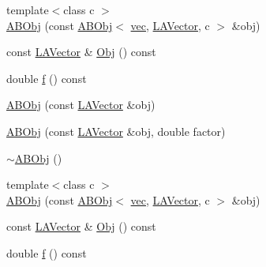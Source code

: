 \begin{DoxyCompactItemize}
\item 
{\footnotesize template$<$class c $>$ }\\\mbox{\hyperlink{classROOT_1_1Minuit2_1_1ABObj_3_01vec_00_01LAVector_00_01double_01_4_aeb6018846b4e8252a64eb21db982fe96}{A\+B\+Obj}} (const \mbox{\hyperlink{classROOT_1_1Minuit2_1_1ABObj}{A\+B\+Obj}}$<$ \mbox{\hyperlink{classROOT_1_1Minuit2_1_1vec}{vec}}, \mbox{\hyperlink{classROOT_1_1Minuit2_1_1LAVector}{L\+A\+Vector}}, c $>$ \&obj)
\item 
const \mbox{\hyperlink{classROOT_1_1Minuit2_1_1LAVector}{L\+A\+Vector}} \& \mbox{\hyperlink{classROOT_1_1Minuit2_1_1ABObj_3_01vec_00_01LAVector_00_01double_01_4_a8c53d63141dbfd9b90f73290b895d87a}{Obj}} () const
\item 
double \mbox{\hyperlink{classROOT_1_1Minuit2_1_1ABObj_3_01vec_00_01LAVector_00_01double_01_4_a418f4c2409e7afb1804e3033a7aed2fd}{f}} () const
\item 
\mbox{\hyperlink{classROOT_1_1Minuit2_1_1ABObj_3_01vec_00_01LAVector_00_01double_01_4_a3b8232d5f2becc9d30bcbc5ad933e41a}{A\+B\+Obj}} (const \mbox{\hyperlink{classROOT_1_1Minuit2_1_1LAVector}{L\+A\+Vector}} \&obj)
\item 
\mbox{\hyperlink{classROOT_1_1Minuit2_1_1ABObj_3_01vec_00_01LAVector_00_01double_01_4_a809b8940cc6667e7171d180577cea95d}{A\+B\+Obj}} (const \mbox{\hyperlink{classROOT_1_1Minuit2_1_1LAVector}{L\+A\+Vector}} \&obj, double factor)
\item 
\mbox{\hyperlink{classROOT_1_1Minuit2_1_1ABObj_3_01vec_00_01LAVector_00_01double_01_4_a31143ce46d8714d3a4a136ec265dc98d}{$\sim$\+A\+B\+Obj}} ()
\item 
{\footnotesize template$<$class c $>$ }\\\mbox{\hyperlink{classROOT_1_1Minuit2_1_1ABObj_3_01vec_00_01LAVector_00_01double_01_4_aeb6018846b4e8252a64eb21db982fe96}{A\+B\+Obj}} (const \mbox{\hyperlink{classROOT_1_1Minuit2_1_1ABObj}{A\+B\+Obj}}$<$ \mbox{\hyperlink{classROOT_1_1Minuit2_1_1vec}{vec}}, \mbox{\hyperlink{classROOT_1_1Minuit2_1_1LAVector}{L\+A\+Vector}}, c $>$ \&obj)
\item 
const \mbox{\hyperlink{classROOT_1_1Minuit2_1_1LAVector}{L\+A\+Vector}} \& \mbox{\hyperlink{classROOT_1_1Minuit2_1_1ABObj_3_01vec_00_01LAVector_00_01double_01_4_a8c53d63141dbfd9b90f73290b895d87a}{Obj}} () const
\item 
double \mbox{\hyperlink{classROOT_1_1Minuit2_1_1ABObj_3_01vec_00_01LAVector_00_01double_01_4_a418f4c2409e7afb1804e3033a7aed2fd}{f}} () const
\end{DoxyCompactItemize}



